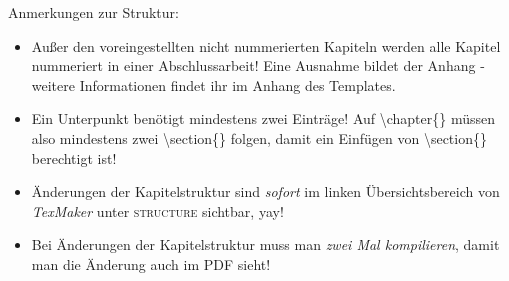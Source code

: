 Anmerkungen zur Struktur:\\%
\begin{itemize}%
\item Außer den voreingestellten nicht nummerierten Kapiteln werden alle Kapitel nummeriert in einer Abschlussarbeit! Eine Ausnahme bildet der Anhang - weitere Informationen findet ihr im Anhang des Templates.%
\item Ein Unterpunkt benötigt mindestens zwei Einträge! Auf \textbackslash chapter\{\} müssen also mindestens zwei \textbackslash section\{\} folgen, damit ein Einfügen von \textbackslash section\{\} berechtigt ist!%
\item Änderungen der Kapitelstruktur sind \emph{sofort} im linken Übersichtsbereich von \emph{TexMaker} unter \textsc{structure} sichtbar, yay!%
\item Bei Änderungen der Kapitelstruktur muss man \emph{zwei Mal kompilieren}, damit man die Änderung auch im PDF sieht!%
\end{itemize}%
%
%
